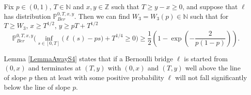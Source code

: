 \begin{lemma}\label{LemmaAwayS4} Fix $p \in (0,1)$, $T \in \mathbb{N}$ and $x, y\in \mathbb{Z}$ such that $T \geq y-x \geq 0$, and suppose that $\ell$ has distribution $\mathbb{P}^{0,T,x,y}_{Ber}$. Then we can find $W_3 = W_3(p) \in \mathbb{N}$ such that for $T \geq W_3$, $ x \geq T^{1/2}$, $ y \geq pT +  T^{1/2}$
\begin{equation}\label{awayS4}
\mathbb{P}^{0,T,x,y}_{Ber}\Big( \inf_{s \in [0,T]} \big( \ell(s) -ps \big)+ T^{1/4} \geq 0 \Big) \geq \frac{1}{2} \left(1 - \exp\left(-\frac{2}{p(1-p)}\right)\right).
\end{equation}
\end{lemma}
\begin{remark} 
Lemma \ref{LemmaAwayS4} states that  if a Bernoulli bridge $\ell$ is started from $(0,x)$ and terminates at $(T,y)$ with $(0,x)$ and $(T,y)$ well above the line of slope $p$ then at least with some positive probability $\ell$ will not fall significantly below the line of slope $p$.
\end{remark}
